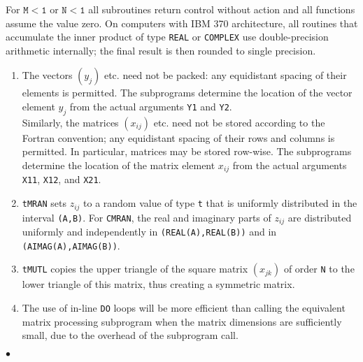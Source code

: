 For $\mathtt{M<1}$ or $\mathtt{N<1}$ all subroutines return control
without action and all functions assume the value zero.
\Accuracy
On computers with IBM 370 architecture, all routines that
accumulate the inner product of type {\tt REAL} or {\tt COMPLEX} use
double-precision arithmetic internally;
the final result is then rounded to single precision.
\Notes
\begin{enumerate}
\item The vectors $(y_j)$ etc. need not be packed: any equidistant
spacing of their elements is permitted. The subprograms determine the
location of the vector element $y_j$ from the actual arguments
{\tt Y1} and {\tt Y2}. \\
Similarly, the matrices $(x_{ij})$ etc. need not be stored according
to the Fortran convention; any equidistant spacing of their rows
and columns is permitted. In particular, matrices may be stored row-wise.
The subprograms determine the location of the matrix element $x_{ij}$
from the actual arguments {\tt X11}, {\tt X12}, and {\tt X21}.
\item {\tt tMRAN} sets $z_{ij}$ to a random value of type {\tt t} that is
uniformly distributed in the interval {\tt (A,B)}. For {\tt CMRAN}, the
real and imaginary parts of $z_{ij}$ are distributed uniformly and
independently in {\tt (REAL(A),REAL(B))} and in
{\tt (AIMAG(A),AIMAG(B))}.
\item {\tt tMUTL} copies the upper triangle of the square matrix
$(x_{jk})$ of order {\tt N} to the lower triangle of this matrix, thus
creating a symmetric matrix.
\item The use of in-line {\tt DO} loops will be more efficient than
calling the equivalent matrix processing subprogram when the matrix
dimensions are sufficiently small, due to the overhead of the
subprogram call.
\end{enumerate}
$\bullet$
